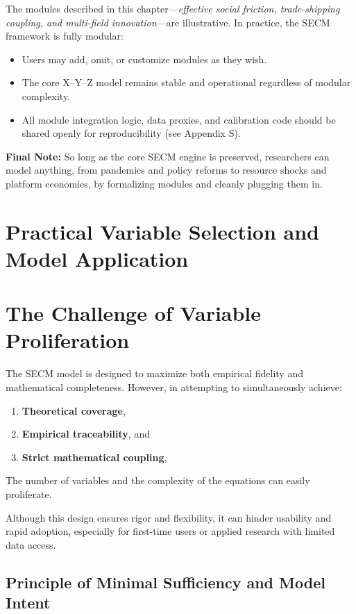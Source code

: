 \documentclass[12pt]{report}
\begin{document}
The modules described in this chapter—\textit{effective social friction, trade-shipping coupling, and multi-field innovation}—are illustrative. In practice, the SECM framework is fully modular:
\begin{itemize}
  \item Users may add, omit, or customize modules as they wish.
  \item The core X–Y–Z model remains stable and operational regardless of modular complexity.
  \item All module integration logic, data proxies, and calibration code should be shared openly for reproducibility (see Appendix S).
\end{itemize}

\textbf{Final Note:} So long as the core SECM engine is preserved, researchers can model anything, from pandemics and policy reforms to resource shocks and platform economies, by formalizing modules and cleanly plugging them in.

\section{Practical Variable Selection and Model Application}

\section{The Challenge of Variable Proliferation}

The SECM model is designed to maximize both empirical fidelity and mathematical completeness. However, in attempting to simultaneously achieve:
\begin{enumerate}
  \item \textbf{Theoretical coverage},
  \item \textbf{Empirical traceability}, and
  \item \textbf{Strict mathematical coupling},
\end{enumerate}
The number of variables and the complexity of the equations can easily proliferate.

Although this design ensures rigor and flexibility, it can hinder usability and rapid adoption, especially for first-time users or applied research with limited data access.

\subsection*{Principle of Minimal Sufficiency and Model Intent}
\end{document}
